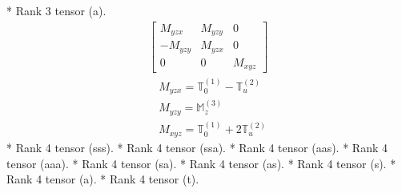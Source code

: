 \documentclass[fleqn,8pt,landscape]{jsarticle}
\begin{document}
* Rank 3 tensor (a).
\begin{align*}
\begin{bmatrix} M_{yzx} & M_{yzy} & 0 \\ - M_{yzy} & M_{yzx} & 0 \\ 0 & 0 & M_{xyz} \end{bmatrix}
\end{align*}
\begin{align*}
& M_{yzx} = \mathbb{T}_{0}^{(1)} - \mathbb{T}_{u}^{(2)} \\
& M_{yzy} = \mathbb{M}_{z}^{(3)} \\
& M_{xyz} = \mathbb{T}_{0}^{(1)} + 2 \mathbb{T}_{u}^{(2)}
\end{align*}
* Rank 4 tensor (sss).
* Rank 4 tensor (ssa).
* Rank 4 tensor (aas).
* Rank 4 tensor (aaa).
* Rank 4 tensor (sa).
* Rank 4 tensor (as).
* Rank 4 tensor (s).
* Rank 4 tensor (a).
* Rank 4 tensor (t).
\end{document}
